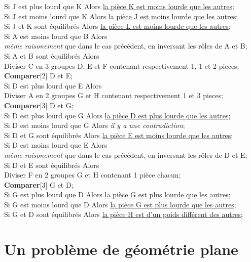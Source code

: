 \documentclass{article}
\begin{document}
\begin{tabbing}
\>\> Si J est plus lourd que K Alors \underline{la pièce K est moins lourde que les autres};\\
\>\> Si J est moins lourd que K Alors \underline{la pièce J est moins lourde que les autres};\\
\>\> Si J et K sont équilibrés Alors \underline{la pièce L est moins lourde que les autres};\\
Si A est moins lourd que B Alors\\
\> {\em même raisonement} que dans le cas précédent, en inversant les rôles de A et B;\\
Si A et B sont équilibrés Alors\\
\> Diviser C en 3 groupes D, E et F contenant respectivement 1, 1 et 2 pieces;\\
\> {\bf Comparer}[2] D et E;\\
\> Si D est plus lourd que E Alors\\
\>\> Diviser A en 2 groupes G et H contenant respectivement 1 et 3 pieces;\\
\>\> {\bf Comparer}[3] D et G;\\
\>\> Si D est plus lourd que G Alors \underline{la pièce D est plus lourde que les autres};\\
\>\> Si D est moins lourd que G Alors {\em il y a une contradiction};\\
\>\> Si D et G sont équilibrés Alors \underline{la pièce E est moins lourde que les autres};\\
\> Si D est moins lourd que E Alors\\
\>\> {\em même raisonement} que dans le cas précédent, en inversant les rôles de D et E;\\
\> Si D et E sont équilibrés Alors\\
\>\> Diviser F en 2 groupes G et H contenant 1 pièce chacun;\\
\>\> {\bf Comparer}[3] G et D;\\
\>\> Si G est plus lourd que D Alors \underline{la pièce G est plus lourde que les autres};\\
\>\> Si G est moins lourd que D Alors \underline{la pièce G est plus lourde que les autres};\\
\>\> Si G et D sont équilibrés Alors \underline{la pièce H est d'un poids différent des autres};
\end{tabbing}

\pagebreak

\section{Un problème de géométrie plane}
\end{document}
